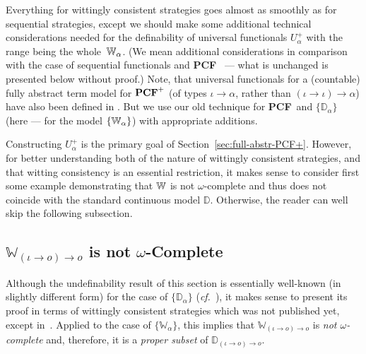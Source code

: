 \documentclass[fleqn]{LMCS}
\theoremstyle{plain}\newtheorem{satz}[thm]{Satz}
\theoremstyle{plain}\newtheorem{hyp}[thm]{Hypothesis}
\theoremstyle{plain}\newtheorem{hyps}[thm]{Hypotheses}
\theoremstyle{definition}\newtheorem{note}[thm]{Note}
\def\cf{{\em cf.}}
\newcommand{\setof}[1]{\{#1\}}
\newcommand{\arr}{\rightarrow}
\newcommand{\tbbW}{\mathbb{W}}\newcommand{\bbD}{\mathbb{D}}
\newcommand{\PCF}{\mbox{\bf PCF}}
\newcommand{\?}{\mbox{?}}
\begin{document}
Everything for wittingly consistent strategies goes almost as smoothly 
as for sequential strategies, except we should make some additional 
technical 
considerations needed for the definability of universal functionals 
$U^+_{\alpha}$
with the range being the whole~$\mathbb{W}_{\alpha}$. 
(We mean additional considerations 
in comparison with the case of sequential functionals and \PCF\ 
\cite{Saz76AL} --- what is unchanged 
is presented below without proof.) 
Note, that universal functionals for 
a (countable) fully abstract term model for $\PCF^+$ 
(of types $\iota\arr\alpha$, rather than $(\iota\arr\iota)\arr\alpha$) 
have also been defined in \cite{Longley-Plotkin}. But we use our old 
technique for \PCF\ and $\setof{\bbD_{\alpha}}$
(here --- for the model $\setof{\bbW_{\alpha}}$) 
with appropriate additions. 

Constructing $U^+_\alpha$ is the primary goal of 
Section~\ref{sec:full-abstr-PCF+}. 
However, for better understanding both of the nature of wittingly consistent 
strategies, and that witting consistency is an essential restriction, 
it makes sense to consider first some example demonstrating 
that $\mathbb{W}$ is not $\omega$-complete and thus does not coincide with 
the standard continuous model $\bbD$. 
Otherwise, the reader can well skip the following subsection. 








































\subsection{\texorpdfstring{$\tbbW_{(\iota\arr o)\arr o}$}{W} is not 
\texorpdfstring{$\omega$}{omega}-Complete}
\label{seq:non-complete}

\noindent
Although the undefinability result of this section is essentially 
well-known (in slightly different form) for the case of $\setof{\bbD_\alpha}$ 
(\cf\ \cite{Plotkin77,Saz76d,Saz76AL}), 
it makes sense to present its proof in terms of wittingly consistent 
strategies which was not published yet, except in~\cite{Saz76t}. 
Applied to the case of $\setof{\tbbW_\alpha}$, this implies that 
$\tbbW_{(\iota\arr o)\arr o}$ is \emph{not $\omega$-complete} and, therefore, 
it is a \emph{proper subset} of $\bbD_{(\iota\arr o)\arr o}$. 
\end{document}
